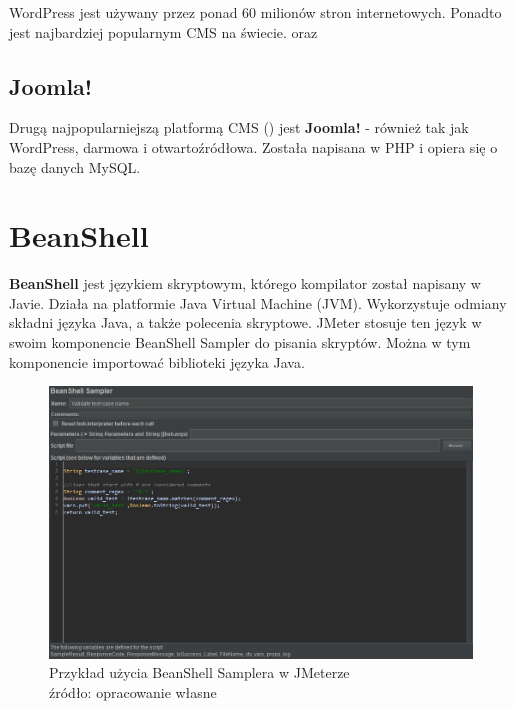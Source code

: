 WordPress jest używany przez ponad 60 milionów stron internetowych. Ponadto jest najbardziej popularnym CMS na świecie.\cite{succ} oraz \cite{wpa}

\subsection{Joomla!}

Drugą najpopularniejszą platformą CMS (\cite{stat}) jest \textbf{Joomla!} - również tak jak WordPress, darmowa i otwartoźródłowa. Została napisana w PHP i opiera się o bazę danych MySQL. \cite{joomla}


\section{BeanShell}

\textbf{BeanShell} jest językiem skryptowym, którego kompilator został napisany w Javie. Działa na platformie Java Virtual Machine (JVM). Wykorzystuje odmiany składni języka Java, a także polecenia skryptowe. JMeter stosuje ten język w swoim komponencie BeanShell Sampler do pisania skryptów. Można w tym komponencie importować biblioteki języka Java. \cite{beanshell}

\begin{figure}[H]
\centering
\captionsetup{justification=centering}
\includegraphics[width=1\textwidth]{BeanShell.PNG}
\caption[Przykład użycia BeanShell Samplera w JMeterze]{\label{fig:ham} Przykład użycia BeanShell Samplera w JMeterze \\ źródło: opracowanie własne}
\end{figure}




